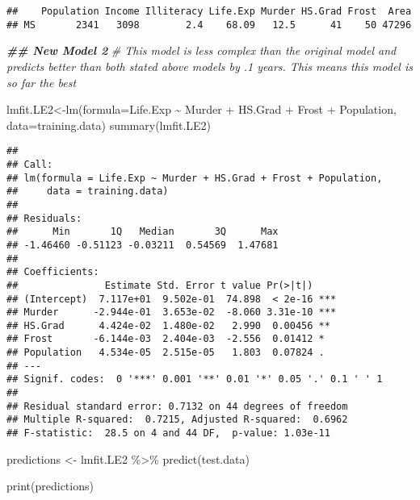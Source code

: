 \documentclass[
]{article}
\newenvironment{Shaded}{\begin{snugshade}}{\end{snugshade}}
\newcommand{\AttributeTok}[1]{\textcolor[rgb]{0.77,0.63,0.00}{#1}}
\newcommand{\CommentTok}[1]{\textcolor[rgb]{0.56,0.35,0.01}{\textit{#1}}}
\newcommand{\DocumentationTok}[1]{\textcolor[rgb]{0.56,0.35,0.01}{\textbf{\textit{#1}}}}
\newcommand{\FunctionTok}[1]{\textcolor[rgb]{0.00,0.00,0.00}{#1}}
\newcommand{\NormalTok}[1]{#1}
\newcommand{\OtherTok}[1]{\textcolor[rgb]{0.56,0.35,0.01}{#1}}
\newcommand{\SpecialCharTok}[1]{\textcolor[rgb]{0.00,0.00,0.00}{#1}}
\begin{document}
\begin{verbatim}
##    Population Income Illiteracy Life.Exp Murder HS.Grad Frost  Area
## MS       2341   3098        2.4    68.09   12.5      41    50 47296
\end{verbatim}

\begin{Shaded}
\begin{Highlighting}[]
\DocumentationTok{\#\# New Model 2}
\CommentTok{\# This model is less complex than the original model and predicts better than both stated above models by .1 years. This means this model is so far the best}

\NormalTok{lmfit.LE2}\OtherTok{\textless{}{-}}\FunctionTok{lm}\NormalTok{(}\AttributeTok{formula=}\NormalTok{Life.Exp }\SpecialCharTok{\textasciitilde{}}\NormalTok{ Murder }\SpecialCharTok{+}\NormalTok{ HS.Grad }\SpecialCharTok{+}\NormalTok{ Frost }\SpecialCharTok{+}\NormalTok{ Population, }\AttributeTok{data=}\NormalTok{training.data)}
\FunctionTok{summary}\NormalTok{(lmfit.LE2)}
\end{Highlighting}
\end{Shaded}

\begin{verbatim}
## 
## Call:
## lm(formula = Life.Exp ~ Murder + HS.Grad + Frost + Population, 
##     data = training.data)
## 
## Residuals:
##      Min       1Q   Median       3Q      Max 
## -1.46460 -0.51123 -0.03211  0.54569  1.47681 
## 
## Coefficients:
##               Estimate Std. Error t value Pr(>|t|)    
## (Intercept)  7.117e+01  9.502e-01  74.898  < 2e-16 ***
## Murder      -2.944e-01  3.653e-02  -8.060 3.31e-10 ***
## HS.Grad      4.424e-02  1.480e-02   2.990  0.00456 ** 
## Frost       -6.144e-03  2.404e-03  -2.556  0.01412 *  
## Population   4.534e-05  2.515e-05   1.803  0.07824 .  
## ---
## Signif. codes:  0 '***' 0.001 '**' 0.01 '*' 0.05 '.' 0.1 ' ' 1
## 
## Residual standard error: 0.7132 on 44 degrees of freedom
## Multiple R-squared:  0.7215, Adjusted R-squared:  0.6962 
## F-statistic:  28.5 on 4 and 44 DF,  p-value: 1.03e-11
\end{verbatim}

\begin{Shaded}
\begin{Highlighting}[]
\NormalTok{predictions }\OtherTok{\textless{}{-}}\NormalTok{ lmfit.LE2 }\SpecialCharTok{\%\textgreater{}\%} \FunctionTok{predict}\NormalTok{(test.data)}

\FunctionTok{print}\NormalTok{(predictions)}
\end{Highlighting}
\end{Shaded}
\end{document}
